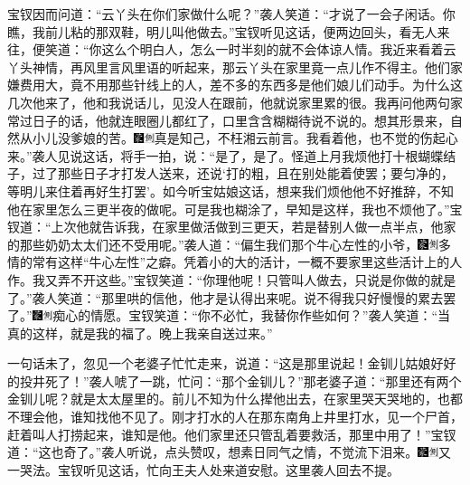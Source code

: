 宝钗因而问道：``云丫头在你们家做什么呢？''袭人笑道：``才说了一会子闲话。你瞧，我前儿粘的那双鞋，明儿叫他做去。''宝钗听见这话，便两边回头，看无人来往，便笑道：``你这么个明白人，怎么一时半刻的就不会体谅人情。我近来看着云丫头神情，再风里言风里语的听起来，那云丫头在家里竟一点儿作不得主。他们家嫌费用大，竟不用那些针线上的人，差不多的东西多是他们娘儿们动手。为什么这几次他来了，他和我说话儿，见没人在跟前，他就说家里累的很。我再问他两句家常过日子的话，他就连眼圈儿都红了，口里含含糊糊待说不说的。想其形景来，自然从小儿没爹娘的苦。{\includegraphics[width=3mm]{../Images/00006}\includegraphics[width=3mm]{../Images/00011}\footnotesize \kaishu 真是知己，不枉湘云前言。}我看着他，也不觉的伤起心来。''袭人见说这话，将手一拍，说：``是了，是了。怪道上月我烦他打十根蝴蝶结子，过了那些日子才打发人送来，还说`打的粗，且在别处能着使罢；要匀净的，等明儿来住着再好生打罢'。如今听宝姑娘这话，想来我们烦他他不好推辞，不知他在家里怎么三更半夜的做呢。可是我也糊涂了，早知是这样，我也不烦他了。''宝钗道：``上次他就告诉我，在家里做活做到三更天，若是替别人做一点半点，他家的那些奶奶太太们还不受用呢。''袭人道：``偏生我们那个牛心左性的小爷，{\includegraphics[width=3mm]{../Images/00006}\includegraphics[width=3mm]{../Images/00011}\footnotesize \kaishu 多情的常有这样``牛心左性''之癖。}凭着小的大的活计，一概不要家里这些活计上的人作。我又弄不开这些。''宝钗笑道：``你理他呢！只管叫人做去，只说是你做的就是了。''袭人笑道：``那里哄的信他，他才是认得出来呢。说不得我只好慢慢的累去罢了。''{\includegraphics[width=3mm]{../Images/00006}\includegraphics[width=3mm]{../Images/00011}\footnotesize \kaishu 痴心的情愿。}宝钗笑道：``你不必忙，我替你作些如何？''袭人笑道：``当真的这样，就是我的福了。晚上我亲自送过来。''

一句话未了，忽见一个老婆子忙忙走来，说道：``这是那里说起！金钏儿姑娘好好的投井死了！''袭人唬了一跳，忙问：``那个金钏儿？''那老婆子道：``那里还有两个金钏儿呢？就是太太屋里的。前儿不知为什么撵他出去，在家里哭天哭地的，也都不理会他，谁知找他不见了。刚才打水的人在那东南角上井里打水，见一个尸首，赶着叫人打捞起来，谁知是他。他们家里还只管乱着要救活，那里中用了！''宝钗道：``这也奇了。''袭人听说，点头赞叹，想素日同气之情，不觉流下泪来。{\includegraphics[width=3mm]{../Images/00006}\includegraphics[width=3mm]{../Images/00011}\footnotesize \kaishu 又一哭法。}宝钗听见这话，忙向王夫人处来道安慰。这里袭人回去不提。

